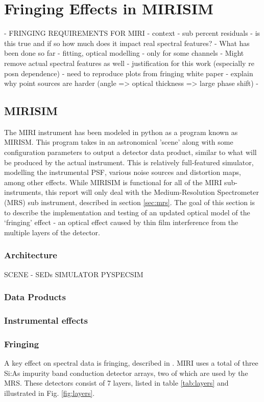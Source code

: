 \chapter{Fringing Effects in MIRISIM}
 - FRINGING REQUIREMENTS FOR MIRI - context
 - sub percent residuals - is this true and if so how much does it impact real spectral features?
 - What has been done so far - fitting, optical modelling
 - only for some channels
 - Might remove actual spectral features as well - justification for this work (especially re posn dependence)
 - need to reproduce plots from fringing white paper
 - explain why point sources are harder (angle => optical thickness => large phase shift)
 - 
\section{MIRISIM}
The MIRI instrument has been modeled in python as a program known as MIRISM. 
This program takes in an astronomical 'scene' along with some configuration parameters to output a detector data product, similar to what will be produced by the actual instrument.
This is relatively full-featured simulator, modelling the instrumental PSF, various noise sources and distortion maps, among other effects.
While MIRISIM is functional for all of the MIRI sub-instruments, this report will only deal with the Medium-Resolution Spectrometer (MRS) sub instrument, described in section \ref{sec:mrs}.
The goal of this section is to describe the implementation and testing of an updated optical model of the `fringing' effect - an optical effect caused by thin film interference from the multiple layers of the detector.
\subsection{Architecture}
SCENE - SEDs
SIMULATOR
PYSPECSIM
\subsection{Data Products}
\subsection{Instrumental effects}
\subsection{Fringing}
A key effect on spectral data is fringing, described in \cite{ref:Argyriou2018}. 
MIRI uses a total of three Si:As impurity band conduction detector arrays, two of which are used by the MRS. 
These detectors consist of 7 layers, listed in table \ref{tab:layers} and illustrated in Fig. \ref{fig:layers}.

